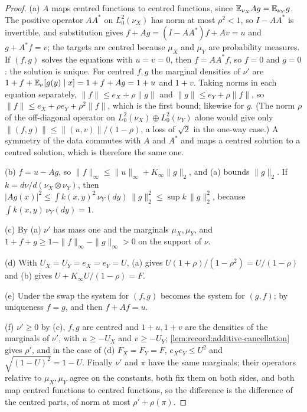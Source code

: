 \begin{proof}
(a) $A$ maps centred functions to centred functions, since
$\mathbb E_{\nu_X}Ag=\mathbb E_{\nu_Y}g$. The positive operator $AA^*$ on $L^2_0(\nu_X)$ has norm
at most $\rho^2<1$, so $I-AA^*$ is invertible, and substitution gives
$f+Ag=(I-AA^*)f+Av=u$ and $g+A^*f=v$; the targets are centred because $\mu_X$
and $\mu_Y$ are probability measures. If $(f,g)$ solves the equations with
$u=v=0$, then $f=AA^*f$, so $f=0$ and $g=0$: the solution is unique. For
centred $f,g$ the marginal densities of $\nu'$ are
$1+f+\mathbb E_\nu[g(y)\mid x]=1+f+Ag=1+u$ and $1+v$. Taking norms in each equation
separately, $\|f\|\le e_X+\rho\|g\|$ and $\|g\|\le e_Y+\rho\|f\|$, so
$\|f\|\le e_X+\rho e_Y+\rho^2\|f\|$, which is the first bound; likewise for $g$.
(The norm $\rho$ of the off-diagonal operator on
$L^2_0(\nu_X)\oplus L^2_0(\nu_Y)$ alone would give only
$\|(f,g)\|\le\|(u,v)\|/(1-\rho)$, a loss of $\sqrt2$ in the one-way case.) A
symmetry of the data commutes with $A$ and $A^*$ and maps a centred solution to
a centred solution, which is therefore the same one.

(b) $f=u-Ag$, so $\|f\|_\infty\le\|u\|_\infty+K_\infty\|g\|_2$, and (a) bounds
$\|g\|_2$. If $k=d\nu/d(\nu_X\otimes\nu_Y)$, then
$|Ag(x)|^2\le\int k(x,y)^2\,\nu_Y(dy)\,\|g\|_2^2\le\sup k\,\|g\|_2^2$, because
$\int k(x,y)\,\nu_Y(dy)=1$.

(c) By (a) $\nu'$ has mass one and the marginals $\mu_X,\mu_Y$, and
$1+f+g\ge1-\|f\|_\infty-\|g\|_\infty>0$ on the support of $\nu$.

(d) With $U_X=U_Y=e_X=e_Y=U$, (a) gives $U(1+\rho)/(1-\rho^2)=U/(1-\rho)$ and (b)
gives $U+K_\infty U/(1-\rho)=F$.

(e) Under the swap the system for $(f,g)$ becomes the system for $(g,f)$; by
uniqueness $f=g$, and then $f+Af=u$.

(f) $\nu'\ge0$ by (c), $f,g$ are centred and $1+u,1+v$ are the densities of the
marginals of $\nu'$, with $u\ge-U_X$ and $v\ge-U_Y$;
\cref{lem:record:additive-cancellation} gives $\rho'$, and in the case of (d)
$F_X=F_Y=F$, $e_Xe_Y\le U^2$ and $\sqrt{(1-U)^2}=1-U$. Finally $\nu'$ and $\pi$
have the same marginals; their operators relative to $\mu_X,\mu_Y$ agree on the
constants, both fix them on both sides, and both map centred functions to
centred functions, so the difference is the difference of the centred parts,
of norm at most $\rho'+\rho(\pi)$.


\end{proof}
